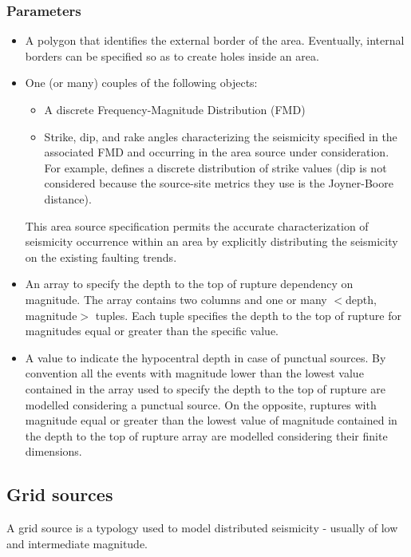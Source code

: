 \subsubsection{Parameters}
\begin{itemize}
\item A polygon that identifies the external border of the area. Eventually, 
internal borders can be specified so as to create holes inside an area.
\item One (or many) couples of the following objects:
\begin{itemize}
	\item A discrete Frequency-Magnitude Distribution (FMD)
	\item Strike, dip, and rake angles characterizing the seismicity specified 
	in the associated FMD and occurring in the area source under consideration. 
	For example, \cite{coppersmith2009} defines a discrete 
	distribution of strike values (dip is not considered because the source-site 
	metrics they use is the Joyner-Boore distance). 
\end{itemize}
This area source specification permits the accurate characterization of 
seismicity occurrence within an area by explicitly distributing the seismicity 
on the existing faulting trends. 
\item An array to specify the depth to the top of rupture dependency on magnitude. 
The array contains two columns and one or many $<$depth, magnitude$>$ tuples. 
Each tuple specifies the depth to the top of rupture for magnitudes equal or 
greater than the specific value. 
\item A value to indicate the hypocentral depth in case of punctual sources. 
By convention all the events with magnitude lower than the lowest value contained 
in the array used to specify the depth to the top of rupture are modelled 
considering a punctual source. On the opposite, ruptures with magnitude equal or 
greater than the lowest value of magnitude contained in the depth to the top of 
rupture array are modelled considering their finite dimensions. 
\end{itemize}
%
\subsection{Grid sources}
A grid source is a typology used to model distributed seismicity - usually 
of low and intermediate magnitude.

